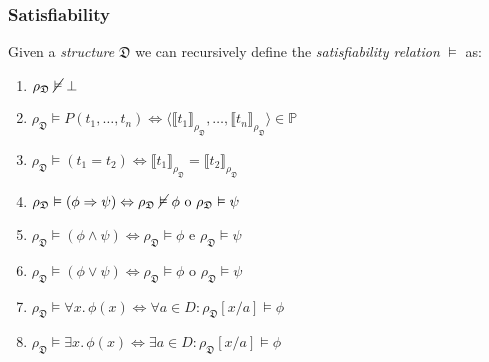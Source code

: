 \documentclass{beamer}
\begin{document}
                \begin{frame}
                    \frametitle{Satisfiability}
                    \begin{definition}
                        Given a \textit{structure} $ \mathfrak{D} $ we can recursively define the \textit{satisfiability relation} $ \vDash $ as:
                        \begin{enumerate}
                            \item $ \rho_\mathfrak{D}\; \cancel{\vDash}\; \bot $
                            \item $ \rho_\mathfrak{D} \vDash P(t_1, \dots, t_n) \Leftrightarrow \langle \llbracket t_1 \rrbracket_{\rho_\mathfrak{D}}, \dots, \llbracket t_n \rrbracket_{\rho_\mathfrak{D}} \rangle \in \mathbb{P} $
                            \item $ \rho_\mathfrak{D} \vDash (t_1 = t_2) \Leftrightarrow\llbracket t_1 \rrbracket_{\rho_\mathfrak{D}} = \llbracket t_2 \rrbracket_{\rho_\mathfrak{D}} $
                            \item $ \rho_\mathfrak{D} \vDash (\phi \Rightarrow \psi) \Leftrightarrow \rho_\mathfrak{D}\; \cancel{\vDash}\; \phi \text{ o } \rho_\mathfrak{D} \vDash \psi $
                            \item $ \rho_\mathfrak{D} \vDash (\phi \wedge \psi) \Leftrightarrow \rho_\mathfrak{D} \vDash \phi \text{ e } \rho_\mathfrak{D} \vDash \psi $
                            \item $ \rho_\mathfrak{D} \vDash (\phi \vee \psi) \Leftrightarrow \rho_\mathfrak{D} \vDash \phi \text{ o } \rho_\mathfrak{D} \vDash \psi $
                            \item $ \rho_\mathfrak{D} \vDash \forall x.\, \phi(x) \Leftrightarrow \forall a \in D: \rho_\mathfrak{D}[x/a] \vDash \phi $
                            \item $ \rho_\mathfrak{D} \vDash \exists x.\, \phi(x) \Leftrightarrow \exists a \in D: \rho_\mathfrak{D}[x/a] \vDash \phi $
                        \end{enumerate}
                    \end{definition}
                \end{frame}
\end{document}
